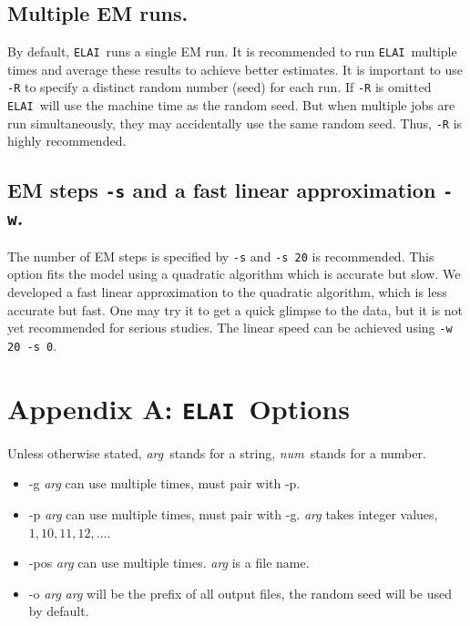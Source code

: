\documentclass[11pt,Palatino]{article}
\def\elai{{\tt{ELAI}}~}
\begin{document}
\subsection{Multiple EM runs.} By default, \elai runs a single EM run. It is recommended to run \elai multiple times and average these results to achieve better estimates. It is important to use {\tt -R} to specify a distinct random number (seed) for each run. If {\tt -R} is omitted \elai will use the machine time as the random seed.  But when multiple jobs are run simultaneously, they may accidentally use the same random seed.  Thus, {\tt -R} is highly recommended.   

\subsection{EM steps {\tt -s} and a fast linear approximation {\tt -w}.} The number of EM steps is specified by {\tt -s} and {\tt -s 20} is recommended. This option fits the model using a quadratic algorithm which is accurate but slow. We developed a fast linear approximation to the quadratic algorithm, which is less accurate but fast. One may try it to get a quick glimpse to the data, but it is not yet recommended for serious studies. The linear speed can be achieved using {\tt -w 20 -s 0}.     

%
%

\def\arg{{\emph{arg~}}}
\def\num{{\emph{num~}}}
\def\file{{\emph{file~}}}

\section{Appendix A: \elai Options}
Unless otherwise stated, \arg stands for a string, \num stands for a number.

\begin{itemize}
\item -g \emph{arg} \hspace{.1in}   can use multiple times, must pair with -p.
\item -p \emph{arg} \hspace{.1in}   can use multiple times, must pair with -g. \emph{arg} takes integer values, $1, 10, 11, 12, \dots$. 
\item  -pos \emph{arg} \hspace{.1in}  can use multiple times. \emph{arg} is a file name.
\item -o \emph{arg}  \hspace{.1in}  \emph{arg} will be the prefix of all output files, the random seed will be used by default.

\end{itemize}
\end{document}
